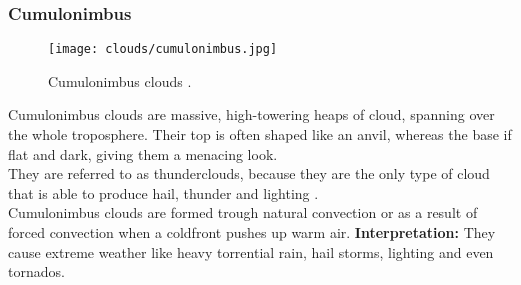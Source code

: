 \pagebreak

\subsubsection{Cumulonimbus}
\begin{wrapfigure}[10]{r}{6.3cm}
    \vspace{-\baselineskip}
    \texttt{[image: clouds/cumulonimbus.jpg]}
    \caption{Cumulonimbus clouds \protect\cite{cloudtypes:wiki:cumulonimbus}.}
    \label{img:clouds:cumulonimbus}
\end{wrapfigure}
Cumulonimbus clouds are massive, high-towering heaps of cloud, spanning over the whole troposphere.
Their top is often shaped like an anvil, whereas the base if flat and dark, giving them a menacing look.
\\
They are referred to as thunderclouds, because they are the only type of cloud that is able to produce hail, thunder and lighting \cite{metoffice:cumulonimbus}.
\\
Cumulonimbus clouds are formed trough natural \gls{convection} or as a result of forced \gls{convection} when a \gls{coldfront} pushes up warm air.
\emptyline
\textbf{Interpretation:}
They cause extreme weather like heavy torrential rain, hail storms, lighting and even tornados.